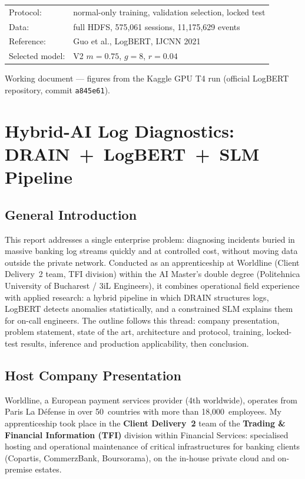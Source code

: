 \documentclass[12pt,a4paper]{report}
\begin{document}
\begin{titlepage}
\begin{center}
\begin{tabular}{ll}
\hline
Protocol: & normal-only training, validation selection, locked test \\
Data: & full HDFS, 575,061 sessions, 11,175,629 events \\
Reference: & Guo et al., LogBERT, IJCNN 2021 \\
Selected model: & V2 $m{=}0{.}75$, $g{=}8$, $r{=}0{.}04$ \\
\hline
\end{tabular}
\vfill
{\normalsize Working document --- figures from the Kaggle GPU T4 run (official LogBERT repository, commit \texttt{a845e61}). \par}
\end{center}
\end{titlepage}

\tableofcontents
\newpage

\chapter{Hybrid-AI Log Diagnostics: DRAIN~+~LogBERT~+~SLM Pipeline}

\section{General Introduction}

This report addresses a single enterprise problem: diagnosing incidents buried in massive banking log streams quickly and at controlled cost, without moving data outside the private network. Conducted as an apprenticeship at Worldline (Client Delivery~2 team, TFI division) within the AI Master's double degree (Politehnica University of Bucharest / 3iL Engineers), it combines operational field experience with applied research: a hybrid pipeline in which DRAIN structures logs, LogBERT detects anomalies statistically, and a constrained SLM explains them for on-call engineers. The outline follows this thread: company presentation, problem statement, state of the art, architecture and protocol, training, locked-test results, inference and production applicability, then conclusion.

\section{Host Company Presentation}

Worldline, a European payment services provider (4th worldwide), operates from Paris La D\'efense in over 50~countries with more than 18,000~employees. My apprenticeship took place in the \textbf{Client Delivery~2} team of the \textbf{Trading \& Financial Information (TFI)} division within Financial Services: specialised hosting and operational maintenance of critical infrastructures for banking clients (Copartis, CommerzBank, Boursorama), on the in-house private cloud and on-premise estates.
\end{document}
